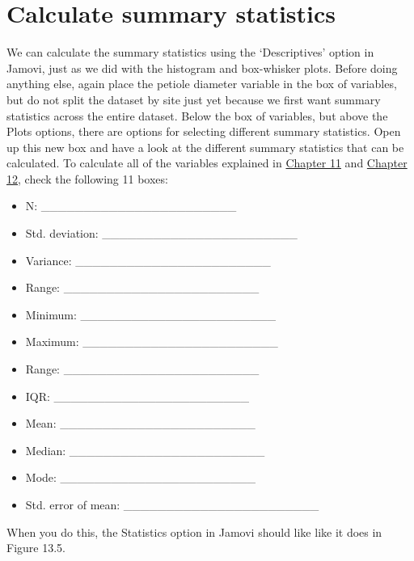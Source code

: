 \documentclass[
]{scrbook}
\providecommand{\tightlist}{%
  \setlength{\itemsep}{0pt}\setlength{\parskip}{0pt}}
\begin{document}
\hypertarget{calculate-summary-statistics}{%
\section{Calculate summary statistics}\label{calculate-summary-statistics}}

We can calculate the summary statistics using the `Descriptives' option in Jamovi, just as we did with the histogram and box-whisker plots.
Before doing anything else, again place the petiole diameter variable in the box of variables, but do not split the dataset by site just yet because we first want summary statistics across the entire dataset.
Below the box of variables, but above the Plots options, there are options for selecting different summary statistics.
Open up this new box and have a look at the different summary statistics that can be calculated.
To calculate all of the variables explained in \protect\hyperlink{Chapter_11}{Chapter 11} and \protect\hyperlink{Chapter_11}{Chapter 12}, check the following 11 boxes:

\begin{itemize}
\tightlist
\item
  N: \_\_\_\_\_\_\_\_\_\_\_\_\_\_\_\_\_\_\_\_\_\_\_
\item
  Std. deviation: \_\_\_\_\_\_\_\_\_\_\_\_\_\_\_\_\_\_\_\_\_\_\_
\item
  Variance: \_\_\_\_\_\_\_\_\_\_\_\_\_\_\_\_\_\_\_\_\_\_\_
\item
  Range: \_\_\_\_\_\_\_\_\_\_\_\_\_\_\_\_\_\_\_\_\_\_\_
\item
  Minimum: \_\_\_\_\_\_\_\_\_\_\_\_\_\_\_\_\_\_\_\_\_\_\_
\item
  Maximum: \_\_\_\_\_\_\_\_\_\_\_\_\_\_\_\_\_\_\_\_\_\_\_
\item
  Range: \_\_\_\_\_\_\_\_\_\_\_\_\_\_\_\_\_\_\_\_\_\_\_
\item
  IQR: \_\_\_\_\_\_\_\_\_\_\_\_\_\_\_\_\_\_\_\_\_\_\_
\item
  Mean: \_\_\_\_\_\_\_\_\_\_\_\_\_\_\_\_\_\_\_\_\_\_\_
\item
  Median: \_\_\_\_\_\_\_\_\_\_\_\_\_\_\_\_\_\_\_\_\_\_\_
\item
  Mode: \_\_\_\_\_\_\_\_\_\_\_\_\_\_\_\_\_\_\_\_\_\_\_
\item
  Std. error of mean: \_\_\_\_\_\_\_\_\_\_\_\_\_\_\_\_\_\_\_\_\_\_\_
\end{itemize}

When you do this, the Statistics option in Jamovi should like like it does in Figure 13.5.
\end{document}
